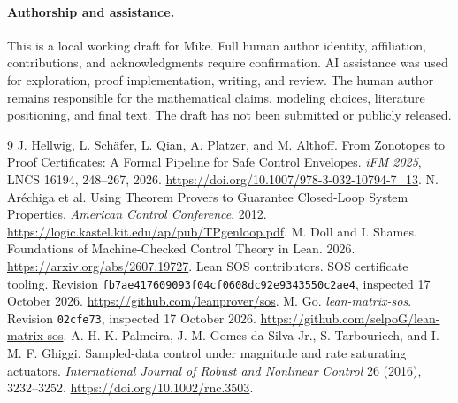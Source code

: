 \documentclass[10pt]{article}
\newcommand{\code}[1]{\texttt{#1}}
\begin{document}
\paragraph{Authorship and assistance.}
This is a local working draft for Mike. Full human author identity, affiliation, contributions, and acknowledgments require confirmation. AI assistance was used for exploration, proof implementation, writing, and review. The human author remains responsible for the mathematical claims, modeling choices, literature positioning, and final text. The draft has not been submitted or publicly released.

\begin{thebibliography}{9}\small
{} J. Hellwig, L. Sch\"afer, L. Qian, A. Platzer, and M. Althoff. From Zonotopes to Proof Certificates: A Formal Pipeline for Safe Control Envelopes. \emph{iFM 2025}, LNCS 16194, 248--267, 2026. \url{https://doi.org/10.1007/978-3-032-10794-7_13}.
 N. Ar\'echiga et al. Using Theorem Provers to Guarantee Closed-Loop System Properties. \emph{American Control Conference}, 2012. \url{https://logic.kastel.kit.edu/ap/pub/TPgenloop.pdf}.
 M. Doll and I. Shames. Foundations of Machine-Checked Control Theory in Lean. 2026. \url{https://arxiv.org/abs/2607.19727}.
 Lean SOS contributors. SOS certificate tooling. Revision \code{fb7ae417609093f04cf0608dc92e9343550c2ae4}, inspected 17 October 2026. \url{https://github.com/leanprover/sos}.
 M. Go. \emph{lean-matrix-sos}. Revision \code{02cfe73}, inspected 17 October 2026. \url{https://github.com/selpoG/lean-matrix-sos}.
 A. H. K. Palmeira, J. M. Gomes da Silva Jr., S. Tarbouriech, and I. M. F. Ghiggi. Sampled-data control under magnitude and rate saturating actuators. \emph{International Journal of Robust and Nonlinear Control} 26 (2016), 3232--3252. \url{https://doi.org/10.1002/rnc.3503}.
\end{thebibliography}
\end{document}
